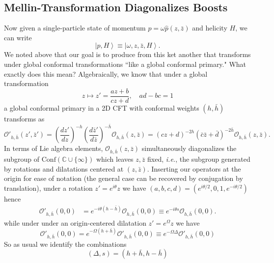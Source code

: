 \documentclass[11pt,letterpaper]{article}
\newcommand{\LP}{\left(}
\newcommand{\RP}{\right)}
\newcommand{\mc}[1]{\mathcal{#1}}
\newcommand{\C}{\mathbb{C}}
\newcommand{\KET}[1]{\left| #1 \right\rangle }
\begin{document}
\subsection{Mellin-Transformation Diagonalizes Boosts}
Now given a single-particle state of momentum $p = \omega \hat{p}(z, \bar{z})$ and helicity $H$, we can write \begin{equation}
\KET{p, H} \equiv \KET{\omega, z, \bar{z}, H}.
\end{equation}
We noted above that our goal is to produce from this ket another that transforms under global conformal transformations ``like a global conformal primary." What exactly does this mean? Algebraically, we know \cite{DiFrancesco:1997nk} that under a global transformation \begin{equation}
z \mapsto z' = \frac{az + b}{cz + d}, \quad ad - bc = 1
\end{equation}
a global conformal primary in a 2D CFT with conformal weights $(h, \bar{h})$ transforms as \begin{equation}
\mc{O}'_{h, \bar{h}}(z', \bar{z}') = \LP \frac{dz'}{dz} \RP^{-h} \LP \frac{d\bar{z}'}{d \bar{z}} \RP^{- \bar{h}} \mc{O}_{h, \bar{h}}(z, \bar{z}) = (cz + d)^{-2h} (\bar{c} \bar{z} + \bar{d})^{-2 \bar{h}} \mc{O}_{h, \bar{h}}(z, \bar{z}).
\end{equation}
In terms of Lie algebra elements, $\mc{O}_{h, \bar{h}}(z,\bar{z})$ simultaneously diagonalizes the subgroup of $\mbox{Conf}(\C \cup \{\infty\})$ which leaves $z, \bar{z}$ fixed, \textit{i.e.}, the subgroup generated by rotations and dilatations centered at $(z, \bar{z})$. Inserting our operators at the origin for ease of notation (the general case can be recovered by conjugation by translation), under a rotation $z' = e^{i \theta} z$ we have $(a,b,c,d) = (e^{i \theta/2}, 0, 1, e^{- i \theta/2})$ hence \begin{equation}
\begin{aligned}
\mc{O}'_{h, \bar{h}}(0, 0) & = e^{-i \theta (h - \bar{h})} \mc{O}_{h, \bar{h}}(0, 0) \equiv e^{-i \theta s} \mc{O}_{h, \bar{h}}(0, 0).
\end{aligned}
\end{equation}
while under under an origin-centered dilatation $z' = e^{\Omega} z$ we have \begin{equation}
\mc{O}'_{h, \bar{h}}(0, 0) = e^{- \Omega(h + \bar{h})} \mc{O}'_{h, \bar{h}}(0, 0) \equiv e^{- \Omega \Delta} \mc{O}'_{h, \bar{h}}(0, 0)
\end{equation}
So as usual we identify the combinations \begin{equation}
\LP \Delta, s \RP = \LP h + \bar{h}, h - \bar{h} \RP
\end{equation}
\end{document}
